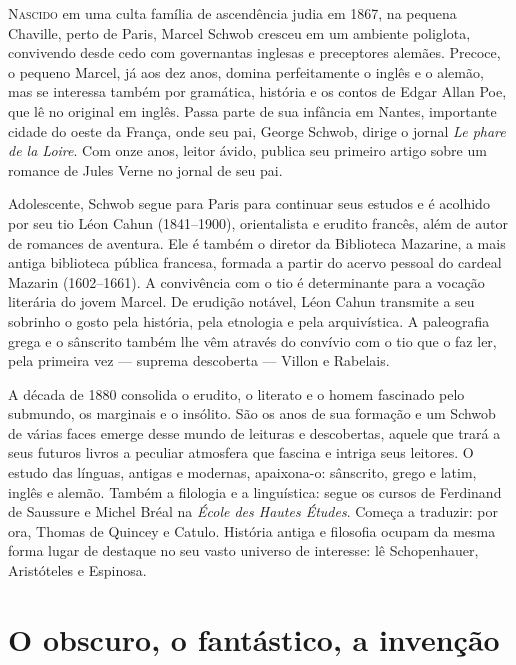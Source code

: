 
\noindent\textsc{Nascido} em uma culta família de ascendência judia em 1867, na pequena
Chaville, perto de Paris, Marcel Schwob cresceu em um ambiente poliglota,
convivendo desde cedo com governantas inglesas e preceptores alemães. Precoce,
o pequeno Marcel, já aos dez anos, domina perfeitamente o inglês e o alemão,
mas se interessa também por gramática, história e os contos de Edgar Allan Poe,
que lê no original em inglês. Passa parte de sua infância em Nantes,
importante cidade do oeste da França, onde seu pai, George Schwob, dirige o
jornal \textit{Le phare de la Loire}. Com onze anos, leitor ávido, publica seu
primeiro artigo sobre um romance de Jules Verne no jornal de seu pai.

Adolescente, Schwob segue para Paris para continuar seus estudos e é
acolhido por seu tio Léon Cahun (1841--1900), orientalista e erudito francês,
além de autor de romances de aventura. Ele é também o diretor da Biblioteca
Mazarine, a mais antiga biblioteca pública francesa, formada a partir do acervo
pessoal do cardeal Mazarin (1602--1661). A convivência com o tio é determinante
para a vocação literária do jovem Marcel. De erudição notável, Léon Cahun
transmite a seu sobrinho o gosto pela história, pela etnologia e pela
arquivística. A paleografia grega e o sânscrito também lhe vêm através do
convívio com o tio que o faz ler, pela primeira vez --- suprema descoberta --- Villon e Rabelais.

A década de 1880 consolida o erudito, o literato e o homem fascinado pelo
submundo, os marginais e o insólito. São os anos de sua formação e um Schwob de
várias faces emerge desse mundo de leituras e descobertas, aquele que trará a
seus futuros livros a peculiar atmosfera que fascina e intriga seus leitores. O
estudo das línguas, antigas e modernas, apaixona-o: sânscrito, grego e latim,
inglês e alemão. Também a filologia e a linguística: segue os cursos de
Ferdinand de Saussure e Michel Bréal na \textit{École des Hautes Études}.
Começa a traduzir: por ora, Thomas de Quincey e Catulo. História antiga e
filosofia ocupam da mesma forma lugar de destaque no seu vasto universo de
interesse: lê Schopenhauer, Aristóteles e Espinosa.

\section{O obscuro, o fantástico, a invenção}

